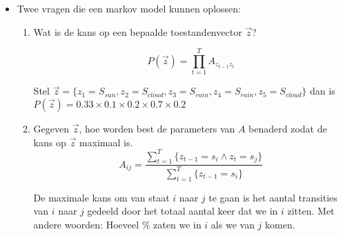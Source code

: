 \begin{itemize}
	\item Twee vragen die een markov model kunnen oplossen:
	\begin{enumerate}
		\item Wat is de kans op een bepaalde toestandenvector $\vec{z}$?

				$$	P(\vec{z})  = \prod_{t=1}^{T} A_{z_{t-1}z_t}$$

			Stel $\vec{z} = \{z_1=S_{sun},z_2=S_{cloud},z_3=S_{rain},z_4=S_{rain},z_5=S_{cloud}\}$ dan is $P(\vec{z}) = 0.33 \times 0.1 \times 0.2 \times 0.7 \times 0.2 $
		\item Gegeven $\vec{z}$, hoe worden best de parameters van $A$ benaderd zodat de kans op $\vec{z}$ maximaal is.
		$$A_{ij} = \frac{\sum_{t=1}^{T} \{z_{t-1} = s_i \wedge z_t = s_j\}}{\sum_{t=1}^{T} \{z_{t-1} = s_i\}}$$
		
		De maximale kans om van staat $i$ naar $j$ te gaan is het aantal transities van $i$ naar $j$ gedeeld door het totaal aantal keer dat we in $i$ zitten. Met andere woorden: Hoeveel \% zaten we in $i$ als we van $j$ komen.
	\end{enumerate}
\end{itemize}

